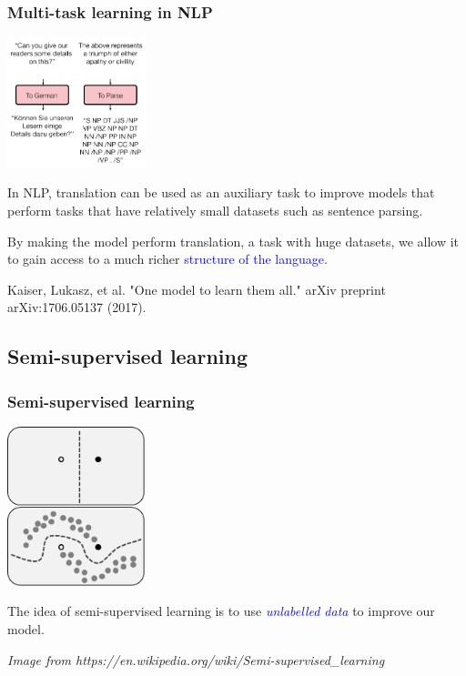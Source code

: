 \documentclass[10pt]{beamer}
\begin{document}
\begin{frame}
  \frametitle{Multi-task learning in NLP}

  \begin{center}
    \includegraphics[width = 4cm]{images/multi_task_nlp.png}
  \end{center}

  In NLP, translation can be used as an auxiliary task to improve
  models that perform tasks that have relatively small datasets such
  as sentence parsing.

  \bigskip

  By making the model perform translation, a task with huge datasets,
  we allow it to gain access to a much richer
  \textcolor{blue}{structure of the language}.

  \bigskip

  {\scriptsize Kaiser, Lukasz, et al. "One model to learn them all."
    arXiv preprint arXiv:1706.05137 (2017).}

\end{frame}

\subsection{Semi-supervised learning}

\begin{frame}

  \frametitle{Semi-supervised learning}

  \begin{center}
    \includegraphics[width=4cm]{images/semi_supervised_learning.png}
  \end{center}

  \bigskip

  The idea of semi-supervised learning is to use
  \textcolor{blue}{\emph{unlabelled data}} to improve our model.

  \bigskip

  {\scriptsize \textit{Image from https://en.wikipedia.org/wiki/Semi-supervised\_learning}}
\end{frame}
\end{document}
